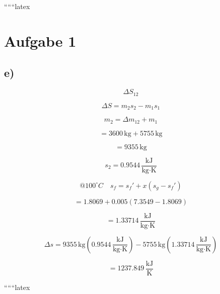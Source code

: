 ``````latex


\section*{Aufgabe 1}

\subsection*{e)}

\[
\Delta S_{12}
\]

\[
\Delta S = m_2 s_2 - m_1 s_1
\]

\[
m_2 = \Delta m_{12} + m_1
\]

\[
= 3600 \, \text{kg} + 5755 \, \text{kg}
\]

\[
= 9355 \, \text{kg}
\]

\[
s_2 = 0.9544 \, \frac{\text{kJ}}{\text{kg} \cdot \text{K}}
\]

\[
@ 100^\circ C \quad s_f = s_f' + x (s_g - s_f')
\]

\[
= 1.8069 + 0.005 (7.3549 - 1.8069)
\]

\[
= 1.33714 \, \frac{\text{kJ}}{\text{kg} \cdot \text{K}}
\]

\[
\Delta s = 9355 \, \text{kg} \left( 0.9544 \, \frac{\text{kJ}}{\text{kg} \cdot \text{K}} \right) - 5755 \, \text{kg} \left( 1.33714 \, \frac{\text{kJ}}{\text{kg} \cdot \text{K}} \right)
\]

\[
= 1237.849 \, \frac{\text{kJ}}{\text{K}}
\]

``````latex


